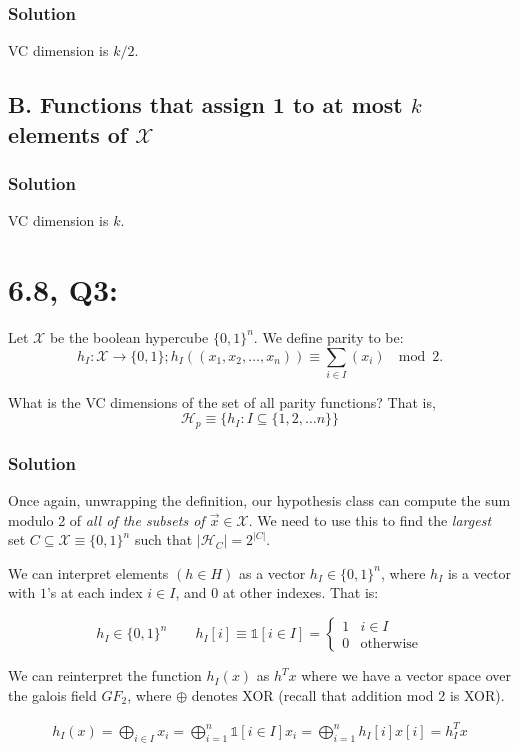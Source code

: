 \documentclass[11pt]{article}
\renewcommand{\H}{\ensuremath{\mathcal{H}}}
\newcommand{\X}{\ensuremath{\mathcal{X}}}
\begin{document}
\subsubsection*{Solution}
VC dimension is $k/2$. 

\subsection*{B. Functions that assign 1 to at most $k$ elements of \X}


\subsubsection*{Solution}
VC dimension is $k$.


\section*{6.8, Q3:}
Let $\X$ be the boolean hypercube $\{0, 1\}^n$. We define parity to be:
$$h_I: \X \rightarrow \{0, 1\}; h_I((x_1, x_2, \dots, x_n)) \equiv \sum_{i \in I} (x_i) ~ \mod 2.$$

What is the VC dimensions of the set of all parity functions? That is,
$$\H_p \equiv \{ h_I : I \subseteq \{1, 2, \dots n\} \}$$

\subsubsection*{Solution}

Once again, unwrapping the definition, our hypothesis class can compute the
sum modulo 2 of \emph{all of the subsets of $\vec x \in \X$}. We need to
use this to find the \emph{largest} set $C \subseteq \X \equiv \{0, 1\}^n$ such
that $|\H_C| = 2^{|C|}$. 

We can interpret elements $(h \in H)$ as a vector 
$h_I \in \{0, 1\}^n$, where $h_I$ is a vector with $1$'s at each index $i \in I$,
and $0$ at other indexes. That is:

$$
h_I \in \{0, 1\}^n \qquad
h_I[i] \equiv \mathbb{1}[i \in I] = 
\begin{cases} 1 & i \in I \\ 0 & \text{otherwise} \end{cases}
$$


We can reinterpret the function $h_I(x)$ as $h^T x$ where we have
a vector space over the galois field $GF_2$, where $\oplus$ denotes XOR (recall
that addition mod 2 is XOR).

\begin{align*}
h_I(x) = \bigoplus_{i \in I} x_i = \bigoplus_{i=1}^n \mathbb{1}[i \in I] x_i = \bigoplus_{i=1}^n h_I[i] x[i] =  h_I^T x
\end{align*}
\end{document}
